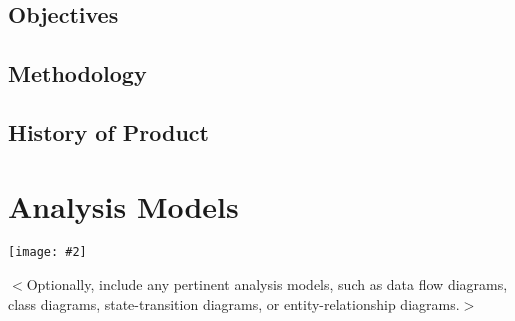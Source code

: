 \documentclass{scrreprt}
\newcommand{\image}[2][1]{
    \begin{center}
        \texttt{[image: \#2]}
    \end{center}
}
\begin{document}
\subsection{Objectives}
\subsection{Methodology}
\subsection{History of Product}

\section{Analysis Models}
\image[0.4]{arion-use-case-diagram}
$<$Optionally, include any pertinent analysis models, such as data flow 
diagrams, class diagrams, state-transition diagrams, or entity-relationship 
diagrams.$>$
\end{document}
